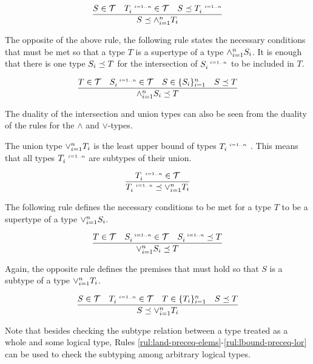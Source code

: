 \documentclass[runningheads]{llncs}
\newcommand{\s}{\scriptscriptstyle\ \,}
\newcommand{\T}{{\cal T}}
\begin{document}
\begin{equation}
\label{rul:lbound-preceq-land}
\dfrac{S\in\T\quad\/T_i^{\s\/i=1..n}\in\T\quad\/S\preceq\/T_i^{\s\/i=1..n}}
      {S\preceq\land_{i=1}^n\/T_i}  
\end{equation} 

The opposite of the above rule, the following rule states the
necessary conditions that must be met so that a type $T$ is a
supertype of a type $\land_{i=1}^n\/S_i$. It is enough that there is
one type $S_i\preceq\/T$ for the intersection of $S_i^{\s\/i=1..n}$ to
be included in $T$.

\begin{equation}
\label{rul:land-preceq-ubound}
\dfrac{T\in\T\quad\/S_i^{\s\/i=1..n}\in\T\quad\/S\in\{S_i\}_{i=1}^n\quad\/S\preceq\/T}
      {\land_{i=1}^n\/S_i\preceq\/T}  
\end{equation} 

The duality of the intersection and union types can also be seen from
the duality of the rules for the $\land$ and $\lor$-types.

The union type $\lor_{i=1}^n\/T_i$ is the least upper bound of types
$T_i^{\s\/i=1..n}$ \cite{Pierce1991}. This means that all types
$T_i^{\s\/i=1..n}$ are subtypes of their union.

\begin{equation}
\label{rul:lor-preceq-elems}
\dfrac{T_i^{\s\/i=1..n}\in\T}
      {T_i^{\s\/i=1..n}\preceq\lor_{i=1}^n\/T_i}
\end{equation}

The following rule defines the necessary conditions to be met for a
type $T$ to be a supertype of a type $\lor_{i=1}^n\/S_i$.

\begin{equation}
\label{rul:lor-preceq-ubound}
\dfrac{T\in\T\quad\/S_i^{\s\/i=1..n}\in\T\quad\/S_i^{\s\/i=1..n}\preceq\/T}
      {\lor_{i=1}^n\/S_i\preceq\/T}  
\end{equation}

Again, the opposite rule defines the premises that must hold so that
$S$ is a subtype of a type $\lor_{i=1}^n\/T_i$.

\begin{equation}
\label{rul:lbound-preceq-lor}
\dfrac{S\in\T\quad\/T_i^{\s\/i=1..n}\in\T\quad\/T\in\{T_i\}_{i=1}^n\quad\/S\preceq\/T}
      {S\preceq\lor_{i=1}^n\/T_i}  
\end{equation}

Note that besides checking the subtype relation between a type treated
as a whole and some logical type, Rules
\ref{rul:land-preceq-elems}-\ref{rul:lbound-preceq-lor} can be used to
check the subtyping among arbitrary logical types.
\end{document}
